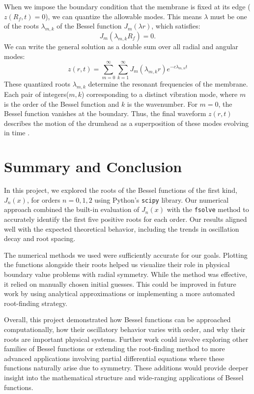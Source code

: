 \documentclass[linenumbers, twocolumn]{aastex631}
\begin{document}
\noindent When we impose the boundary condition that the membrane is fixed at
its edge ($z(R_f,t)=0$), we can quantize the allowable modes. This means $\lambda$
must be one of the roots $\lambda_{m,k}$ of the Bessel 
function $J_m(\lambda r)$, which satisfies:
\begin{equation}
    J_m(\lambda_{m,k}R_f)=0.
\end{equation}
\noindent We can write the general solution as a double sum over all radial and
angular modes:
\begin{equation}
    z(r,t)=\sum_{m=0}^\infty \sum_{k=1}^\infty J_m(\lambda_{m,k}r)e^{-c\lambda_{m,n}t}
\end{equation}
\noindent These quantized roots $\lambda_{m,k}$ determine the resonant frequencies
of the membrane. Each pair of integers($m,k$) corresponding to a distinct
vibration mode, where $m$ is the order of the Bessel function and $k$ is the wavenumber.
For $m=0$, the Bessel function vanishes at the boundary. Thus, the final waveform
$z(r,t)$ describes the motion of the drumhead as a superposition of these modes evolving in time \cite{tamrin}.\\


\section{Summary and Conclusion} \label{sec:summary}

In this project, we explored the roots of the Bessel functions of the first kind, 
$J_n(x)$, for orders $n=0,1,2$ using Python's \texttt{scipy} library. Our numerical
approach combined the built-in evaluation of $J_n(x)$ with the \texttt{fsolve}
method to accurately identify the first five positive roots for each order. Our
results aligned well with the expected theoretical behavior, including the trends
in oscillation decay and root spacing.

\noindent The numerical methods we used were sufficiently accurate for our goals.
Plotting the functions alongside their roots helped us visualize their role in
physical boundary value problems with radial symmetry. While the method was
effective, it relied on manually chosen initial guesses. This could be improved in
future work by using analytical approximations or implementing a more automated
root-finding strategy.

\noindent Overall, this project demonstrated how Bessel functions can be approached
computationally, how their oscillatory behavior varies with order, and why their
roots are important physical systems. Further work could involve exploring other 
families of Bessel functions or extending the root-finding method to more
advanced applications involving partial differential equations where these functions
naturally arise due to symmetry. These additions would provide deeper insight into the
mathematical structure and wide-ranging applications of Bessel functions.\\
\end{document}
